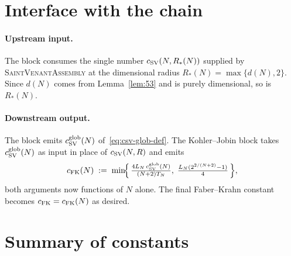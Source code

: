 \documentclass[11pt]{article}
\theoremstyle{definition}
\begin{document}
\section{Interface with the chain}\label{sec:interface}

\paragraph{Upstream input.}
The block consumes the single number
$c_{\rm SV}(N,R_{*}(N))$ supplied by \textsc{SaintVenantAssembly} at
the dimensional radius $R_{*}(N)=\max\{d(N),2\}$. Since $d(N)$ comes
from Lemma~\ref{lem:53} and is purely dimensional, so is $R_{*}(N)$.

\paragraph{Downstream output.}
The block emits $c_{\rm SV}^{\rm glob}(N)$
of~\eqref{eq:csv-glob-def}. The Kohler--Jobin block takes
$c_{\rm SV}^{\rm glob}(N)$ as input in place of $c_{\rm SV}(N,R)$ and
emits
\[
   c_{\rm FK}(N)
   \;:=\;\min\!\Bigl\{\,
       \tfrac{4L_{N}\,c_{\rm SV}^{\rm glob}(N)}{(N+2)T_{N}},\;
       \tfrac{L_{N}(2^{2/(N+2)}-1)}{4}\,
   \Bigr\},
\]
both arguments now functions of $N$ alone. The final Faber--Krahn
constant becomes $c_{\rm FK}=c_{\rm FK}(N)$ as desired.

\section{Summary of constants}\label{sec:summary}
\end{document}
